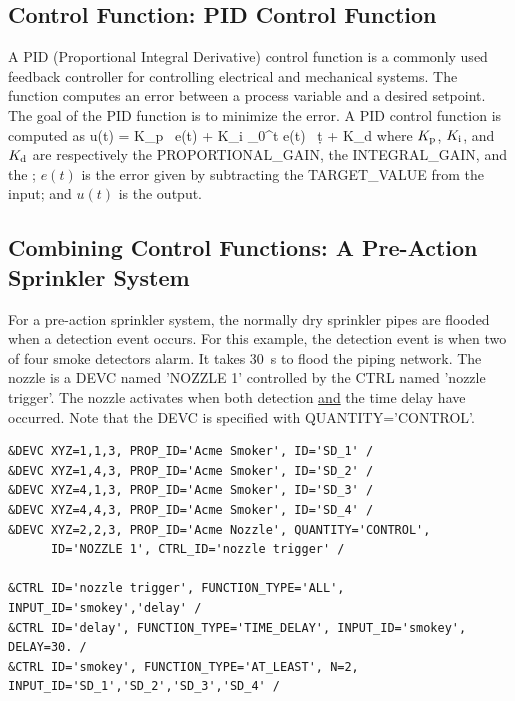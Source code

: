 \documentclass[11pt]{book}
\begin{document}
\subsection{Control Function: PID Control Function}
\label{info:CONTROL_PID}

A PID (Proportional Integral Derivative) control function is a commonly used feedback controller for controlling electrical and mechanical systems.  The function computes an error between a process variable and a desired setpoint.  The goal of the PID function is to minimize the error.  A PID control function is computed as
\be u(t) \; = \; K_{\rm p} \, e(t) \; + \; \; K_{\rm i} \int_0^t \! e(t) \, \d t   \; + \; K_{\rm d} \ee
where $K_{\rm p}$, $K_{\rm i}$, and $K_{\rm d}$ are respectively the {\ct PROPORTIONAL\_GAIN}, the {\ct INTEGRAL\_GAIN}, and the
; $e(t)$ is the error given by subtracting the {\ct TARGET\_VALUE} from the input; and $u(t)$ is the output.

\subsection{Combining Control Functions: A Pre-Action Sprinkler System}

For a pre-action sprinkler system, the normally
dry sprinkler pipes are flooded when a detection event occurs. For this example, the detection event is
when two of four smoke detectors alarm.  It takes 30~s to flood the piping network.
The nozzle is a {\ct DEVC} named {\ct 'NOZZLE 1'} controlled by the {\ct CTRL} named {\ct 'nozzle trigger'}.
The nozzle activates when both detection \underline{and} the time delay have occurred.  Note that the {\ct DEVC} is
specified with {\ct QUANTITY='CONTROL'}.

\begin{lstlisting}
&DEVC XYZ=1,1,3, PROP_ID='Acme Smoker', ID='SD_1' /
&DEVC XYZ=1,4,3, PROP_ID='Acme Smoker', ID='SD_2' /
&DEVC XYZ=4,1,3, PROP_ID='Acme Smoker', ID='SD_3' /
&DEVC XYZ=4,4,3, PROP_ID='Acme Smoker', ID='SD_4' /
&DEVC XYZ=2,2,3, PROP_ID='Acme Nozzle', QUANTITY='CONTROL',
      ID='NOZZLE 1', CTRL_ID='nozzle trigger' /

&CTRL ID='nozzle trigger', FUNCTION_TYPE='ALL', INPUT_ID='smokey','delay' /
&CTRL ID='delay', FUNCTION_TYPE='TIME_DELAY', INPUT_ID='smokey', DELAY=30. /
&CTRL ID='smokey', FUNCTION_TYPE='AT_LEAST', N=2, INPUT_ID='SD_1','SD_2','SD_3','SD_4' /
\end{lstlisting}
\end{document}
